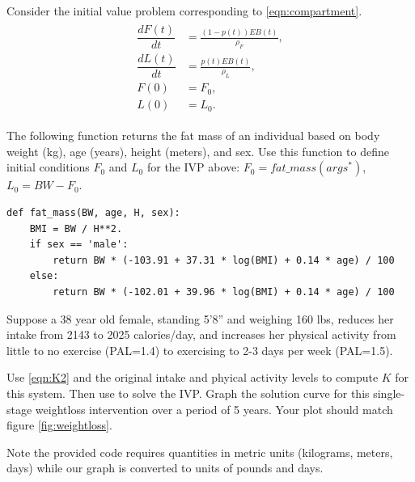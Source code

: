 \begin{problem}

Consider the initial value problem corresponding to \eqref{eqn:compartment}.
\begin{align}
	\begin{split}
\dfrac{dF(t)}{dt} &= \frac{(1-p(t)) EB(t)}{\rho_F},\\
\dfrac{dL(t)}{dt} &= \frac{p(t) EB(t)}{\rho_L},\\
F(0) &= F_0, \\
L(0) &= L_0.
	\end{split}\label{eqn:weight_prob1}
\end{align}

The following function returns the fat mass of an individual based on body weight (kg), age (years), height (meters), and sex. Use this function to define initial conditions $F_0$ and $L_0$ for the IVP above: $F_0= fat\_mass(args^*)$, $L_0 = BW - F_0$.%
\begin{lstlisting}
def fat_mass(BW, age, H, sex):
    BMI = BW / H**2.
    if sex == 'male':
        return BW * (-103.91 + 37.31 * log(BMI) + 0.14 * age) / 100
    else:
        return BW * (-102.01 + 39.96 * log(BMI) + 0.14 * age) / 100
\end{lstlisting}

Suppose a 38 year old female, standing 5'8'' and weighing 160 lbs, reduces her intake from 2143 to 2025 calories/day, and increases her physical activity from little to no exercise (PAL=1.4) to exercising to 2-3 days per week (PAL=1.5).

Use \eqref{eqn:K2} and the original intake and phyical activity levels to compute $K$ for this system. Then use  to solve the IVP. Graph the solution curve for this single-stage weightloss intervention over a period of 5 years. Your plot should match figure \ref{fig:weightloss}.

Note the provided code requires quantities in metric units (kilograms, meters, days) while our graph is converted to units of pounds and days.
\end{problem}

